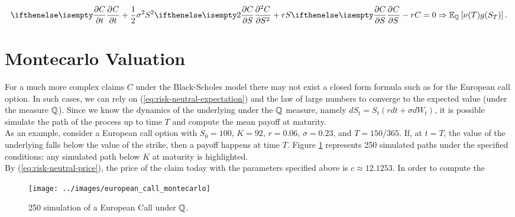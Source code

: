 \documentclass[../TGMAFFIRO.tex]{subfiles}
\begin{document}
\begin{equation}
	\partialwrt{C}{t} + \frac{1}{2}\sigma^2S^2\partialwrt[2]{C}{S} + rS\partialwrt{C}{S} - rC = 0 \Rightarrow \ExpMeasure{\Qm}{\nu(T)g(S_T)}.
\end{equation}

\section{Montecarlo Valuation}
For a much more complex claims $C$ under the Black-Scholes model there may not exist a closed form formula such as for the European call option. In such cases, we can rely on (\ref{eq:risk-neutral-expectation}) and the law of large numbers to converge to the expected value (under the measure $\mathbb{Q}$). Since we know the dynamics of the underlying under the $\mathbb{Q}$ measure, namely $dS_t = S_t\left(rdt + \sigma dW_t\right)$, it is possible simulate the path of the process up to time $T$ and compute the mean payoff at maturity.\\

As an example, consider a European call option with $S_0 = 100$, $K = 92$, $r = 0.06$, $\sigma = 0.23$, and $T = 150 / 365$. If, at $t=T$, the value of the underlying falls below the value of the strike, then a payoff happens at time $T$. Figure \ref{fig:montecarlo_simulation} represents 250 simulated paths under the specified conditions; any simulated path below $K$ at maturity is highlighted.\\

By (\ref{eq:risk-neutral-price}), the price of the claim today with the parameters specified above is $c\approx 12.1253$. In order to compute the 

\begin{figure}[h!]
  \texttt{[image: ../images/european\_call\_montecarlo]}
  \label{fig:montecarlo_simulation}
  \caption{250 simulation of a European Call under $\mathbb{Q}$.}
\end{figure}
\end{document}
